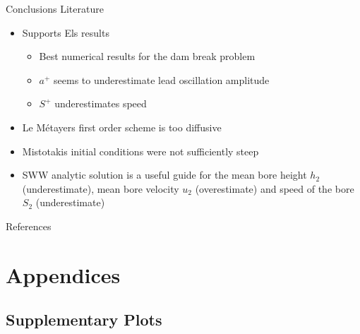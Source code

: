 \documentclass[pdf]{beamer}
\newcommand\solidrule[1][0.25cm]{\rule[0.5ex]{#1}{1pt}}
\newcommand{\dotrule}[1]{%
	\parbox[]{#1}{\dotfill}}
\begin{document}
\begin{frame}{Conclusions}
	Literature
	\begin{itemize}
		\item Supports Els results
		    \begin{itemize}
		    	\item{Best numerical results for the dam break problem}
		    	\item{$a^+$ seems to underestimate lead oscillation amplitude}
		    	\item{$S^+$ underestimates speed}
		    \end{itemize}
		\item Le M\'{e}tayers first order scheme is too diffusive
		\item Mistotakis initial conditions were not sufficiently steep
		\item SWW analytic solution is a useful guide for the mean bore height $h_2$ (underestimate), mean bore velocity $u_2$ (overestimate) and speed of the bore $S_2$ (underestimate)
	\end{itemize}	
\end{frame}

\begin{frame}[allowframebreaks]{References}


\end{frame}

\section{Appendices}
\subsection{Supplementary Plots}
\end{document}
